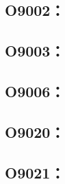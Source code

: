 \subsection{O9002：}



\clearpage
\subsection{O9003：}



\subsection{O9006：}



\clearpage
\subsection{O9020：}



\subsection{O9021：}



\clearpage
